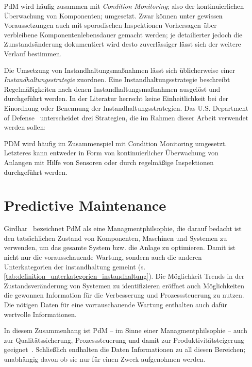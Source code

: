 PdM wird häufig zusammen mit \textit{Condition Monitoring}; also der kontinuierlichen Überwachung von Komponenten; umgesetzt. Zwar können unter gewissen Voraussetzungen auch mit sporadischen Inspektionen Vorhersagen über verbleibene Komponentenlebensdauer gemacht werden; je detailierter jedoch die Zunstandsänderung dokumentiert wird desto zuverlässiger lässt sich der weitere Verlauf bestimmen. 



Die Umsetzung von Instandhaltungsmaßnahmen lässt sich üblicherweise einer \textit{Instandhaltungsstrategie} zuordnen. Eine Instandhaltungsstrategie beschreibt Regelmäßigkeiten nach denen Instandhaltungsmaßnahmen ausgelöst und durchgeführt werden. In der Literatur herrscht keine Einheitlichkeit bei der Einordnung oder Benennung der Instandhaltungsstrategien. Das U.S. Department of Defense~\cite[p.~16]{U.S.DepartmentofDefense.2008} unterscheidet drei Strategien, die im Rahmen dieser Arbeit verwendet werden sollen:


PDM wird häufig im Zusammenspiel mit Condition Monitoring umgesetzt. Letzteres kann entweder in Form von kontinuierlicher Überwachung von Anlangen mit Hilfe von Sensoren oder durch regelmäßige Inspektionen durchgeführt werden.

\section{Predictive Maintenance}
\label{sec:predictive_maintenance}
Girdhar~\cite[p.~4]{Girdhar.2004} bezeichnet PdM als eine Managmentphilsophie, die darauf bedacht ist den tatsächlichen Zustand von Komponenten, Maschinen und Systemen zu verwenden, um das gesamte System bzw. die Anlage zu optimieren. Damit ist nicht nur die vorausschauende Wartung, sondern auch die anderen Unterkategorien der instandhaltung gemeint (s. \cref{tab:definition_unterkategorien_instandhaltung}). Die Möglichkeit Trends in der Zustandsveränderung von Systemen zu identifizieren eröffnet auch Möglichkeiten die gewonnen Information für die Verbesserung und Prozesssteuerung zu nutzen. Die nötigen Daten für eine vorrauschauende Wartung enthalten auch dafür wertvolle Informationen.

In diesem Zusammenhang ist PdM -- im Sinne einer Managmentphilsophie -- auch zur Qualitätssicherung, Prozesssteuerung und damit zur Produktivitätsteigerung geeignet~\cite{Mobley.2002}. Schließlich endhalten die Daten Informationen zu all diesen Bereichen; unabhängig davon ob sie nur für einen Zweck aufgenohmen werden.



